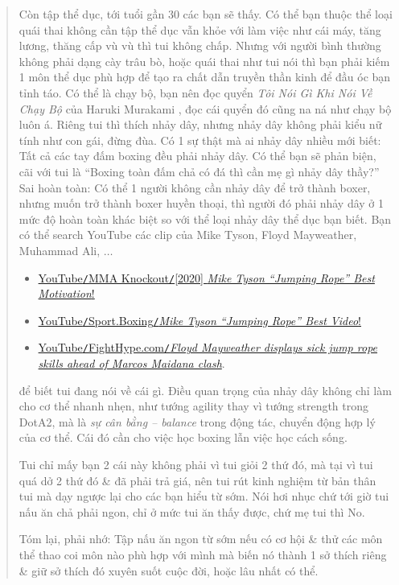 \documentclass[12pt]{article}
\begin{document}
\begin{quotation}
	Còn tập thể dục, tới tuổi gần 30 các bạn sẽ thấy. Có thể bạn thuộc thể loại quái thai không cần tập thể dục vẫn khỏe với làm việc như cái máy, tăng lương, thăng cấp vù vù thì tui không chấp. Nhưng với người bình thường không phải dạng cày trâu bò, hoặc quái thai như tui nói thì bạn phải kiếm 1 môn thể dục phù hợp để tạo ra chất dẫn truyền thần kinh để đầu óc bạn tỉnh táo. Có thể là chạy bộ, bạn nên đọc quyển {\it Tôi Nói Gì Khi Nói Về Chạy Bộ} của Haruki Murakami \cite{Murakami_run}, đọc cái quyển đó cũng na ná như chạy bộ luôn á. Riêng tui thì thích nhảy dây, nhưng nhảy dây không phải kiểu nữ tính như con gái, đừng đùa. Có 1 sự thật mà ai nhảy dây nhiều mới biết: Tất cả các tay đấm boxing đều phải nhảy dây. Có thể bạn sẽ phản biện, cãi với tui là ``Boxing toàn đấm chả có đá thì cần mẹ gì nhảy dây thầy?'' Sai hoàn toàn: Có thể 1 người không cần nhảy dây để trở thành boxer, nhưng muốn trở thành boxer huyền thoại, thì người đó phải nhảy dây ở 1 mức độ hoàn toàn khác biệt so với thể loại nhảy dây thể dục bạn biết. Bạn có thể search YouTube các clip của {\sc Mike Tyson, Floyd Mayweather, Muhammad Ali}, $\ldots$
	\begin{itemize}
		\item \href{https://www.youtube.com/watch?v=zE9qenTx2oE}{YouTube{\tt/}MMA Knockout{\tt/}[2020] {\it Mike Tyson ``Jumping Rope'' Best Motivation}!}
		\item \href{https://www.youtube.com/watch?v=aPhtkIADFkc}{YouTube{\tt/}Sport.Boxing{\tt/}{\it Mike Tyson ``Jumping Rope'' Best Video}!}
		\item \href{https://www.youtube.com/watch?v=Z5m1O5niSr0}{YouTube{\tt/}FightHype.com{\tt/}{\it Floyd Mayweather displays sick jump rope skills ahead of Marcos Maidana clash}}.
	\end{itemize}
	để biết tui đang nói về cái gì. Điều quan trọng của nhảy dây không chỉ làm cho cơ thể nhanh nhẹn, như tướng agility thay vì tướng strength trong DotA2, mà là {\it sự cân bằng -- balance} trong động tác, chuyển động hợp lý của cơ thể. Cái đó cần cho việc học boxing lẫn việc học cách sống.
	
	Tui chỉ mấy bạn 2 cái này không phải vì tui giỏi 2 thứ đó, mà tại vì tui quá dở 2 thứ đó \& đã phải trả giá, nên tui rút kinh nghiệm từ bản thân tui mà dạy ngược lại cho các bạn hiểu từ sớm. Nói hơi nhục chứ tới giờ tui nấu ăn chả phải ngon, chỉ ở mức tui ăn thấy được, chứ mẹ tui thì No.
	
	Tóm lại, phải nhớ: Tập nấu ăn ngon từ sớm nếu có cơ hội \& thử các môn thể thao coi môn nào phù hợp với mình mà biến nó thành 1 sở thích riêng \& giữ sở thích đó xuyên suốt cuộc đời, hoặc lâu nhất có thể.
\end{quotation}
\end{document}
